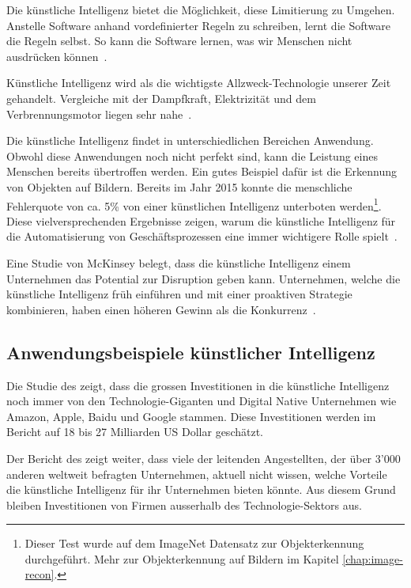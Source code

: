 Die künstliche Intelligenz bietet die Möglichkeit, diese Limitierung zu Umgehen. Anstelle Software anhand vordefinierter Regeln zu schreiben, lernt die Software die Regeln selbst. So kann die Software lernen, was wir Menschen nicht ausdrücken können~\autocite{McAfee}.

Künstliche Intelligenz wird als die wichtigste Allzweck-Technologie unserer Zeit gehandelt. Vergleiche mit der Dampfkraft, Elektrizität und dem Verbrennungsmotor liegen sehr nahe~\autocite{McAfee}.

Die künstliche Intelligenz findet in unterschiedlichen Bereichen Anwendung. Obwohl diese Anwendungen noch nicht perfekt sind, kann die Leistung eines Menschen bereits übertroffen werden. Ein gutes Beispiel dafür ist die Erkennung von Objekten auf Bildern. Bereits im Jahr 2015 konnte die menschliche Fehlerquote von ca. 5\% von einer künstlichen Intelligenz unterboten werden\footnote{Dieser Test wurde auf dem ImageNet Datensatz zur Objekterkennung durchgeführt. Mehr zur Objekterkennung auf Bildern im Kapitel \ref{chap:image-recon}.}. Diese vielversprechenden Ergebnisse zeigen, warum die künstliche Intelligenz für die Automatisierung von Geschäftsprozessen eine immer wichtigere Rolle spielt~\autocite{McAfee}.

Eine Studie von McKinsey belegt, dass die künstliche Intelligenz einem Unternehmen das Potential zur Disruption geben kann. Unternehmen, welche die künstliche Intelligenz früh einführen und mit einer proaktiven Strategie kombinieren, haben einen höheren Gewinn als die Konkurrenz~\autocite{Bughin}. 

\subsection{Anwendungsbeispiele künstlicher Intelligenz}


Die Studie des \textcite{Bughin} zeigt, dass die grossen Investitionen in die künstliche Intelligenz noch immer von den Technologie-Giganten und Digital Native Unternehmen wie Amazon, Apple, Baidu und Google stammen. Diese Investitionen werden im Bericht auf 18 bis 27 Milliarden US Dollar geschätzt. 

Der Bericht des \textcite{Bughin} zeigt weiter, dass viele der leitenden Angestellten, der über 3'000 anderen weltweit befragten Unternehmen, aktuell nicht wissen, welche Vorteile die künstliche Intelligenz für ihr Unternehmen bieten könnte. Aus diesem Grund bleiben Investitionen von Firmen ausserhalb des Technologie-Sektors aus.

